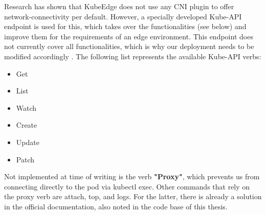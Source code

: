 \documentclass[MIC,Master,english]{twbook}%
\begin{document}
Research has shown that KubeEdge does not use any CNI plugin to offer network-connectivity per default. However, a specially developed Kube-API endpoint is used for this, which  takes over the functionalities (see below) and improve them for the requirements of an edge environment. This endpoint does not currently cover all functionalities, which is why our deployment needs to be modified accordingly \cite{ke-ake-gh}.
\vspace{\baselineskip}
The following list represents the available Kube-API verbs:
\begin{itemize}
    \itemsep0em 
    \item Get
    \item List
    \item Watch
    \item Create
    \item Update
    \item Patch
\end{itemize}

Not implemented at time of writing is the verb \textbf{"Proxy"}, which prevents us from connecting directly to the pod via kubectl exec. Other commands that rely on the proxy verb are attach, top, and logs. For the latter, there is already a solution in the official documentation, also noted in the code base of this thesis.\medbreak
\end{document}
